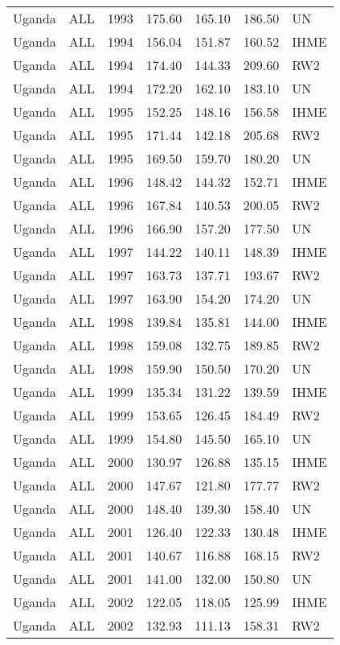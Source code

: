 \begin{longtable}{lllrrrl}
  Uganda & ALL & 1993 & 175.60 & 165.10 & 186.50 & UN \\ 
  Uganda & ALL & 1994 & 156.04 & 151.87 & 160.52 & IHME \\ 
  Uganda & ALL & 1994 & 174.40 & 144.33 & 209.60 & RW2 \\ 
  Uganda & ALL & 1994 & 172.20 & 162.10 & 183.10 & UN \\ 
  Uganda & ALL & 1995 & 152.25 & 148.16 & 156.58 & IHME \\ 
  Uganda & ALL & 1995 & 171.44 & 142.18 & 205.68 & RW2 \\ 
  Uganda & ALL & 1995 & 169.50 & 159.70 & 180.20 & UN \\ 
  Uganda & ALL & 1996 & 148.42 & 144.32 & 152.71 & IHME \\ 
  Uganda & ALL & 1996 & 167.84 & 140.53 & 200.05 & RW2 \\ 
  Uganda & ALL & 1996 & 166.90 & 157.20 & 177.50 & UN \\ 
  Uganda & ALL & 1997 & 144.22 & 140.11 & 148.39 & IHME \\ 
  Uganda & ALL & 1997 & 163.73 & 137.71 & 193.67 & RW2 \\ 
  Uganda & ALL & 1997 & 163.90 & 154.20 & 174.20 & UN \\ 
  Uganda & ALL & 1998 & 139.84 & 135.81 & 144.00 & IHME \\ 
  Uganda & ALL & 1998 & 159.08 & 132.75 & 189.85 & RW2 \\ 
  Uganda & ALL & 1998 & 159.90 & 150.50 & 170.20 & UN \\ 
  Uganda & ALL & 1999 & 135.34 & 131.22 & 139.59 & IHME \\ 
  Uganda & ALL & 1999 & 153.65 & 126.45 & 184.49 & RW2 \\ 
  Uganda & ALL & 1999 & 154.80 & 145.50 & 165.10 & UN \\ 
  Uganda & ALL & 2000 & 130.97 & 126.88 & 135.15 & IHME \\ 
  Uganda & ALL & 2000 & 147.67 & 121.80 & 177.77 & RW2 \\ 
  Uganda & ALL & 2000 & 148.40 & 139.30 & 158.40 & UN \\ 
  Uganda & ALL & 2001 & 126.40 & 122.33 & 130.48 & IHME \\ 
  Uganda & ALL & 2001 & 140.67 & 116.88 & 168.15 & RW2 \\ 
  Uganda & ALL & 2001 & 141.00 & 132.00 & 150.80 & UN \\ 
  Uganda & ALL & 2002 & 122.05 & 118.05 & 125.99 & IHME \\ 
  Uganda & ALL & 2002 & 132.93 & 111.13 & 158.31 & RW2 \\ 

\end{longtable}
